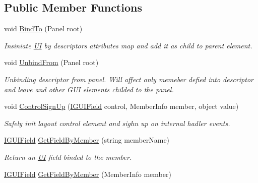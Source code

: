 \subsection*{Public Member Functions}
\begin{DoxyCompactItemize}
\item 
void \mbox{\hyperlink{class_wpf_handler_1_1_u_i_1_1_auto_layout_1_1_u_i_descriptor_af342f6e3f3a3fc86eed3e998bbce1cc5}{Bind\+To}} (Panel root)
\begin{DoxyCompactList}\small\item\em Insiniate \mbox{\hyperlink{namespace_wpf_handler_1_1_u_i}{UI}} by descriptor\textquotesingle{}s attributes map and add it as child to parent element. \end{DoxyCompactList}\item 
void \mbox{\hyperlink{class_wpf_handler_1_1_u_i_1_1_auto_layout_1_1_u_i_descriptor_aa2a2328a6283c4df8aad0b8f925922e8}{Unbind\+From}} (Panel root)
\begin{DoxyCompactList}\small\item\em Unbinding descriptor from panel. Will affect only memeber defied into descriptor and leave and other G\+UI elements childed to the panel. \end{DoxyCompactList}\item 
void \mbox{\hyperlink{class_wpf_handler_1_1_u_i_1_1_auto_layout_1_1_u_i_descriptor_a2862ba93b12a9698b88795d41c672f97}{Control\+Sign\+Up}} (\mbox{\hyperlink{interface_wpf_handler_1_1_u_i_1_1_auto_layout_1_1_i_g_u_i_field}{I\+G\+U\+I\+Field}} control, Member\+Info member, object value)
\begin{DoxyCompactList}\small\item\em Safely init layout control element and sighn up on internal hadler events. \end{DoxyCompactList}\item 
\mbox{\hyperlink{interface_wpf_handler_1_1_u_i_1_1_auto_layout_1_1_i_g_u_i_field}{I\+G\+U\+I\+Field}} \mbox{\hyperlink{class_wpf_handler_1_1_u_i_1_1_auto_layout_1_1_u_i_descriptor_af39e8fdd24e6de1956b0e3b60fa74368}{Get\+Field\+By\+Member}} (string member\+Name)
\begin{DoxyCompactList}\small\item\em Return an \mbox{\hyperlink{namespace_wpf_handler_1_1_u_i}{UI}} field binded to the member. \end{DoxyCompactList}\item 
\mbox{\hyperlink{interface_wpf_handler_1_1_u_i_1_1_auto_layout_1_1_i_g_u_i_field}{I\+G\+U\+I\+Field}} \mbox{\hyperlink{class_wpf_handler_1_1_u_i_1_1_auto_layout_1_1_u_i_descriptor_ab965d93a86ca10bb9e7b30ac14fcfad8}{Get\+Field\+By\+Member}} (Member\+Info member)

\end{DoxyCompactItemize}
